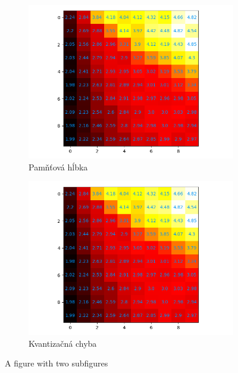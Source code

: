 \begin{figure}[H]
    \centering
    \begin{subfigure}{.5\textwidth}
        \centering
        \includegraphics[width=\linewidth]{assets/recsom_abcd}
        \caption{Pamňťová hĺbka}
        \label{fig:sub1}
    \end{subfigure}%
    \begin{subfigure}{.5\textwidth}
        \centering
        \includegraphics[width=\linewidth]{assets/recsom_abcd}
        \caption{Kvantizačná chyba}
        \label{fig:sub2}
    \end{subfigure}
    \caption{A figure with two subfigures}
    \label{fig:test}
\end{figure}
    
